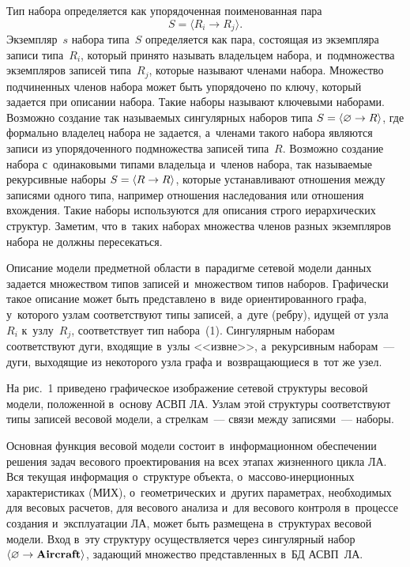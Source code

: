 \begin{multicols}{2}
Тип набора определяется как упорядоченная поименованная 
пара 
\begin{equation}
S=\langle R_i\to R_j\rangle.
\label{e1-v}
\end{equation}
 Экземпляр~$s$ набора типа~$S$ 
определяется как пара, состоящая из экземпляра записи типа~$R_i$, который 
принято называть владельцем набора, и~подмножества экземпляров записей 
типа~$R_j$, которые называют членами набора. Множество подчиненных 
членов набора может быть упорядочено по ключу, который задается при 
описании набора. Такие наборы называют ключевыми наборами. Возможно 
создание так называемых сингулярных наборов типа $S\hm= \langle \varnothing 
\hm\to R\rangle$, где формально владелец набора не задается, а~членами такого 
набора являются записи из упорядоченного подмножества записей типа~$R$. 
Возможно создание набора с~одинаковыми типами владельца и~членов набора, 
так на\-зы\-ва\-емые рекурсивные наборы $S\hm= \langle R\hm\to R\rangle$, которые 
устанавливают отношения между записями одного типа, например отношения 
наследования или отношения вхож\-де\-ния. Такие наборы используются для 
описания строго иерархических \mbox{структур.} Заметим, что в~таких наборах 
множества членов разных экземпляров набора не должны пе\-ре\-се\-каться. 
{

}
  
  Описание модели предметной области в~парадигме сетевой модели данных 
задается множеством типов записей и~множеством типов наборов. Графически 
такое описание может быть представлено в~виде ориентированного графа, 
у~которого узлам соответствуют типы записей, а~дуге (ребру), идущей от 
узла~$R_i$ к~узлу~$R_j$, соответствует тип набора~(1). 
Сингулярным наборам соответствуют дуги, входящие в~узлы 
<<извне>>, а~рекурсивным наборам~--- дуги, выходящие из некоторого узла 
графа и~возвращающиеся в~тот же узел.
  
  На рис.~1 приведено графическое изображение сетевой структуры весовой 
модели, положенной в~основу АСВП ЛА. Узлам этой структуры соответствуют 
типы записей весовой модели, а стрелкам~--- связи между записями~--- наборы.
  

  
  Основная функция весовой модели состоит в~информационном обеспечении 
решения задач весового проектирования на всех этапах жизненного цикла ЛА. 
Вся текущая информация о~структуре объекта, о~мас\-со\-во-инер\-ци\-он\-ных 
характеристиках (МИХ), о~геометрических и~других параметрах, необходимых для 
весовых расчетов, для весового анализа и~для весового контроля в~процессе 
создания и~эксплуатации ЛА, может быть размещена 
в~структурах весовой модели. Вход в~эту структуру осуществляется через 
сингулярный набор $\langle \varnothing\hm\to \mbox{\textbf{Aircraft}}\rangle$, 
задающий множество представленных в~БД 
\mbox{АСВП}~ЛА. 


\end{multicols}
